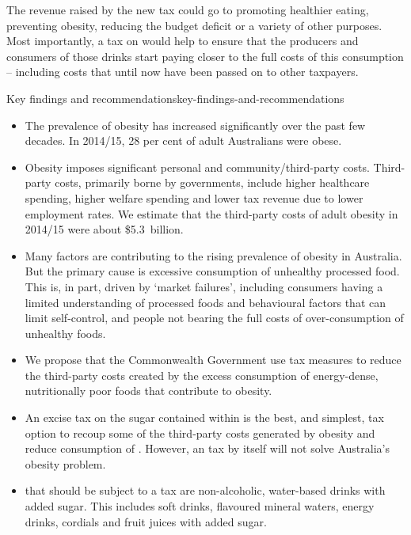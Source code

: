 \documentclass[embargoed]{grattan}
\begin{document}
\begin{overview}
The revenue raised by the new tax could go to promoting healthier eating, preventing obesity, reducing the budget deficit or a variety of other purposes.
Most importantly, a tax on \SSBs{} would help to ensure that the producers and consumers of those drinks start paying closer to the full costs of this consumption – including costs that until now have been passed on to other taxpayers.



\end{overview}

\begin{bigboxreco}{Key findings and recommendations}{key-findings-and-recommendations}

\begin{itemize}
\item
  The prevalence of obesity has increased significantly over the past few decades.
In 2014/15, 28 per cent of adult Australians were obese.
\item
  Obesity imposes significant personal and community/third-party costs.
Third-party costs, primarily borne by governments, include higher healthcare spending, higher welfare spending and lower tax revenue due to lower employment rates.
We estimate that the third-party costs of adult obesity in 2014/15 were about \$5.3~billion.
\item
  Many factors are contributing to the rising prevalence of obesity in Australia.
But the primary cause is excessive consumption of unhealthy processed food.
This is, in part, driven by `market failures', including consumers having a limited understanding of processed foods and behavioural factors that can limit self-control, and people not bearing the full costs of over-consumption of unhealthy foods.
\item
  We propose that the Commonwealth Government use tax measures to reduce the third-party costs created by the excess consumption of energy-dense, nutritionally poor foods that contribute to obesity.
\item
  An excise tax on the sugar contained within \SSBs{} is the best, and simplest, tax option to recoup some of the third-party costs generated by obesity and reduce consumption of \SSBs{}.
However, an \SSB{} tax by itself will not solve Australia's obesity problem.
\item
  \SSBs{} that should be subject to a tax are non-alcoholic, water-based drinks with added sugar.
This includes soft drinks, flavoured mineral waters, energy drinks, cordials and fruit juices with added sugar.

\end{itemize}
\end{bigboxreco}
\end{document}
